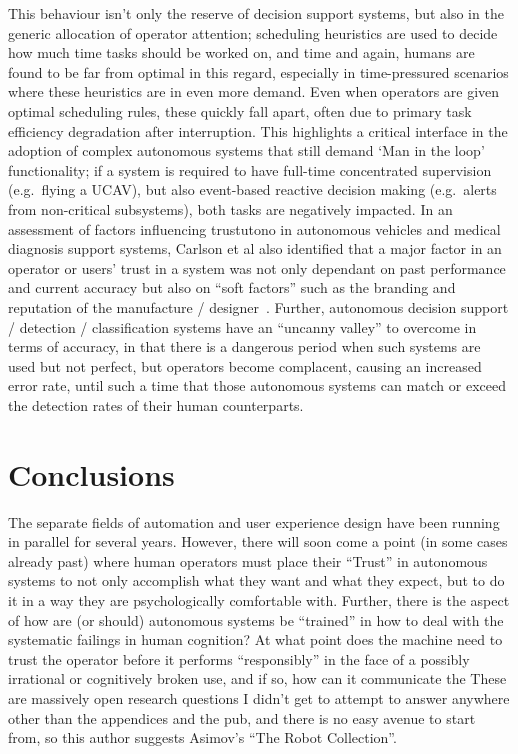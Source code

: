 This behaviour isn't only the reserve of decision support systems, but also in the generic allocation of operator attention; scheduling heuristics are used to decide how much time tasks should be worked on, and time and again, humans are found to be far from optimal in this regard, especially in time-pressured scenarios where these heuristics are in even more demand.
Even when operators are given optimal scheduling rules, these quickly fall apart, often due to primary task efficiency degradation after interruption.
This highlights a critical interface in the adoption of complex autonomous systems that still demand ‘Man in the loop’ functionality; if a system is required to have full-time concentrated supervision (e.g.\ flying a UCAV), but also event-based reactive decision making (e.g.\ alerts from non-critical subsystems), both tasks are negatively impacted.
In an assessment of factors influencing trustutono in autonomous vehicles and medical diagnosis support systems, Carlson et al also identified that a major factor in an operator or users’ trust in a system was not only dependant on past performance and current accuracy but also on ``soft factors'' such as the branding and reputation of the manufacture / designer~\cite{Carlson2014}.
Further, autonomous decision support / detection / classification systems have an ``uncanny valley'' to overcome in terms of accuracy, in that there is a dangerous period when such systems are used but not perfect, but operators become complacent, causing an increased error rate, until such a time that those autonomous systems can match or exceed the detection rates of their human counterparts.

\section{Conclusions}
The separate fields of automation and user experience design have been running in parallel for several years.
However, there will soon come a point (in some cases already past) where human operators must place their ``Trust'' in autonomous systems to not only accomplish what they want and what they expect, but to do it in a way they are psychologically comfortable with. 
Further, there is the aspect of how are (or should) autonomous systems be ``trained'' in how to deal with the systematic failings in human cognition?
At what point does the machine need to trust the operator before it performs ``responsibly'' in the face of a possibly irrational or cognitively broken use, and if so, how can it communicate the 
These are massively open research questions I didn't get to attempt to answer anywhere other than the appendices and the pub, and there is no easy avenue to start from, so this author suggests Asimov's ``The Robot Collection''.

